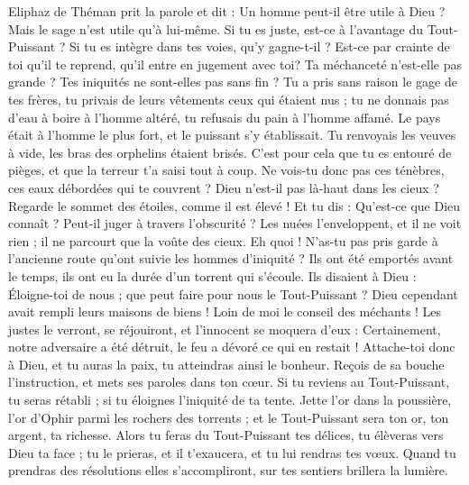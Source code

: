 \begin{multicols}{2}
\VerseOne{}Eliphaz de Théman prit la parole et dit :
Un homme peut-il être utile à Dieu ? Mais le sage n'est utile qu'à lui-même.
Si tu es juste, est-ce à l'avantage du Tout-Puissant ? Si tu es intègre dans tes voies, qu'y gagne-t-il ?
Est-ce par crainte de toi qu'il te reprend, qu'il entre en jugement avec toi?
Ta méchanceté n'est-elle pas grande ? Tes iniquités ne sont-elles pas sans fin ?
Tu a pris sans raison le gage de tes frères, tu privais de leurs vêtements ceux qui étaient nus ;
tu ne donnais pas d'eau à boire à l'homme altéré, tu refusais du pain à l'homme affamé.
Le pays était à l'homme le plus fort, et le puissant s'y établissait.
Tu renvoyais les veuves à vide, les bras des orphelins étaient brisés.
C'est pour cela que tu es entouré de pièges, et que la terreur t'a saisi tout à coup.
Ne vois-tu donc pas ces ténèbres, ces eaux débordées qui te couvrent ?
Dieu n'est-il pas là-haut dans les cieux ? Regarde le sommet des étoiles, comme il est élevé !
Et tu dis : Qu'est-ce que Dieu connaît ? Peut-il juger à travers l'obscurité ?
Les nuées l'enveloppent, et il ne voit rien ; il ne parcourt que la voûte des cieux.
Eh quoi ! N'as-tu pas pris garde à l'ancienne route qu'ont suivie les hommes d'iniquité ?
Ils ont été emportés avant le temps, ils ont eu la durée d'un torrent qui s'écoule.
Ils disaient à Dieu : Éloigne-toi de nous ; que peut faire pour nous le Tout-Puissant ?
Dieu cependant avait rempli leurs maisons de biens ! Loin de moi le conseil des méchants !
Les justes le verront, se réjouiront, et l'innocent se moquera d'eux :
Certainement, notre adversaire a été détruit, le feu a dévoré ce qui en restait !
Attache-toi donc à Dieu, et tu auras la paix, tu atteindras ainsi le bonheur.
Reçois de sa bouche l'instruction, et mets ses paroles dans ton cœur.
Si tu reviens au Tout-Puissant, tu seras rétabli ; si tu éloignes l'iniquité de ta tente.
Jette l'or dans la poussière, l'or d'Ophir parmi les rochers des torrents ;
et le Tout-Puissant sera ton or, ton argent, ta richesse.
Alors tu feras du Tout-Puissant tes délices, tu élèveras vers Dieu ta face ;
tu le prieras, et il t'exaucera, et tu lui rendras tes vœux.
Quand tu prendras des résolutions elles s'accompliront, sur tes sentiers brillera la lumière.

\end{multicols}
